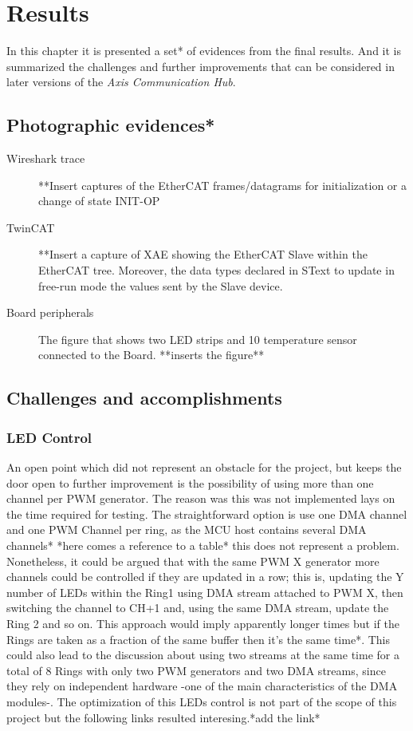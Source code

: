\chapter{Results}\label{cha:results}

In this chapter it is presented a set* of evidences from the final results. And it is summarized the challenges and further improvements that can be considered in later versions of the \emph{Axis Communication Hub}.

\section{Photographic evidences*}
\begin{description}
\item[Wireshark trace] **Insert captures of the EtherCAT frames/datagrams for initialization or a change of state INIT-OP
\item[TwinCAT] **Insert a capture of XAE showing the EtherCAT Slave within the EtherCAT tree. Moreover, the data types declared in SText to update in free-run mode the values sent by the Slave device.
\item[Board peripherals] The figure that shows two LED strips and 10 temperature sensor connected to the Board. **inserts the figure**
\end{description}

\section{Challenges and accomplishments}\label{sec:challenges}
\subsection{LED Control}

An open point which did not represent an obstacle for the project, but keeps the door open to further improvement is the possibility of using more than one channel per PWM generator. The reason was this was not implemented lays on the time required for testing. The straightforward option is use one DMA channel and one PWM Channel per ring, as the MCU host contains several DMA channels* *here comes a reference to a table* this does not represent a problem. Nonetheless, it could be argued that with the same PWM X generator more channels could be controlled if they are updated in a row; this is, updating the Y number of LEDs within the Ring1 using DMA stream attached to PWM X, then switching the channel to CH+1 and, using the same DMA stream, update the Ring 2 and so on. This approach would imply apparently longer times but if the Rings are taken as a fraction of the same buffer then it's the same time*. This could also lead to the discussion about using two streams at the same time for a total of 8 Rings with only two PWM generators and two DMA streams, since they rely on independent hardware -one of the main characteristics of the DMA modules-. The optimization of this LEDs control is not part of the scope of this project but the following links resulted interesing.*add the link*

